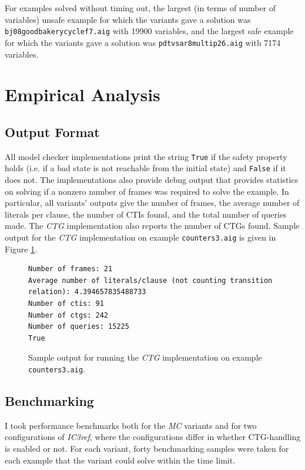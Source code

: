 \documentclass[12pt,a4paper,twoside,openright]{report}
\begin{document}
{For examples solved without timing out,
the largest (in terms of number of variables) unsafe example for which the variants gave a
solution was \verb,bj08goodbakerycyclef7.aig, with 19900 variables,
and the largest safe example for which the variants gave a solution
was \verb,pdtvsar8multip26.aig, with 7174 variables.
\section{Empirical Analysis}

\subsection{Output Format}
\label{eval:output}

All model checker implementations print the string \verb,True, if the safety
property holds (i.e. if a bad state is not reachable from the initial state) and
\verb,False, if it does not. The implementations also provide debug output that provides
statistics on solving if a nonzero number of frames was required to solve the example.
In particular, all variants' outputs give the number of frames, the average number of
literals per clause, the number of CTIs found, and the total number of queries made. The {\it CTG} implementation also reports the number of CTGs found. Sample output
for the {\it CTG} implementation on example \verb,counters3.aig,
is given in Figure \ref{sampleoutput}.

\begin{figure}[t]
\centering
\begin{lstlisting}[keywordstyle = \ttfamily, basicstyle = \footnotesize\ttfamily]
Number of frames: 21
Average number of literals/clause (not counting transition relation): 4.394657835488733
Number of ctis: 91
Number of ctgs: 242
Number of queries: 15225
True
\end{lstlisting}
\caption{Sample output for running the {\it CTG} implementation on example {\tt counters3.aig}.}
\label{sampleoutput}
\end{figure}

\subsection{Benchmarking}
\label{eval:benchmarking}
I took performance benchmarks both for the \emph{MC} variants and for two configurations
of \emph{IC3ref}, where the configurations differ in whether CTG-handling is enabled
or not. For each variant, forty benchmarking samples were taken for each example that
the variant could solve within the time limit.

}
\end{document}
